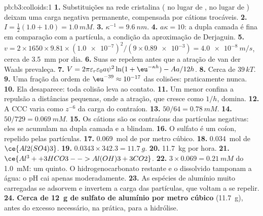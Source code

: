 \begin{solution}{pb:b3:colloids:1}
\textbf{1.} Substituições na rede cristalina ( no lugar de ,  no lugar de ) deixam
uma carga negativa permanente, compensada por cátions trocáveis.
\textbf{2.} $I = \frac12(1.0 + 1.0) = \qty{1.0}{mM}$.
\textbf{3.} $\kappa^{-1} = \qty{9.6}{nm}$.
\textbf{4.} $a\kappa = 10$: a dupla camada é fina em comparação com a partícula, a
condição da aproximação de Derjaguin.
\textbf{5.} $v = 2 \times 1650 \times 9.81 \times (\num{1.0e-7})^2/(9 \times \num{0.89e-3}) = \qty{4.0e-8}{m/s}$, cerca de \qty{3.5}{mm} por dia.
\textbf{6.} Suas  se repelem antes que a atração de van der Waals prevaleça.
\textbf{7.} $V = 2\pi\varepsilon_r\varepsilon_0a\psi^2\ln(1 + \eu^{-\kappa h}) - Aa/12h$.
\textbf{8.} Cerca de $39\,kT$.
\textbf{9.} Uma fração da ordem de $\eu^{-39} \approx 10^{-17}$ das colisões: praticamente nunca.
\textbf{10.} Ela desaparece: toda colisão leva ao contato.
\textbf{11.} Um  menor confina a repulsão a distâncias pequenas, onde
a atração, que cresce como $1/h$, domina.
\textbf{12.} A CCC varia como $z^{-6}$ da carga do contraíon.
\textbf{13.} $50/64 = \qty{0.78}{mM}$.
\textbf{14.} $50/729 = \qty{0.069}{mM}$.
\textbf{15.} Os cátions são os contraíons das partículas negativas: eles se acumulam na
dupla camada e a blindam.
\textbf{16.} O sulfato é um coíon, repelido pelas partículas.
\textbf{17.} \qty{0.069}{mol} de  por metro cúbico.
\textbf{18.} \qty{0.034}{mol} de $\ce{Al2(SO4)3}$.
\textbf{19.} $0.0343 \times 342.3 = \qty{11.7}{g}$.
\textbf{20.} \qty{11.7}{kg} por hora.
\textbf{21.} $\ce{Al^3+ + 3 HCO3- -> Al(OH)3 + 3 CO2}$.
\textbf{22.} $3 \times 0.069 = \qty{0.21}{mM}$ do \qty{1.0}{mM}: um quinto. O hidrogenocarbonato
restante e o  dissolvido tamponam a água: o pH cai apenas
moderadamente.
\textbf{23.} As espécies de alumínio muito carregadas se adsorvem e invertem a carga das
partículas, que voltam a se repelir.
\textbf{24.} \textbf{Cerca de \qty{12}{g} de sulfato de alumínio por metro cúbico} (\qty{11.7}{g}), antes do
excesso necessário, na prática, para a hidrólise.
\end{solution}
